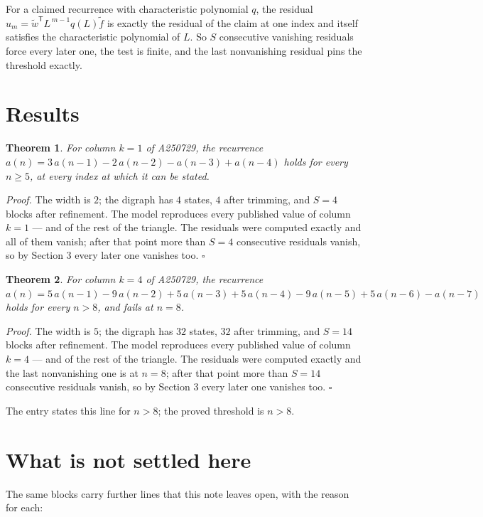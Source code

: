 \documentclass[11pt]{article}
\newtheorem{theorem}{Theorem}
\theoremstyle{definition}
\begin{document}
For a claimed recurrence with characteristic polynomial $q$, the residual $u_m = \tilde w^{\mathsf T}L^{\,m-1}q(L)\tilde f$ is exactly the residual of the claim at one index and itself satisfies the characteristic polynomial of $L$. So $S$ consecutive vanishing residuals force every later one, the test is finite, and the last nonvanishing residual pins the threshold exactly.

\section{Results}

\begin{theorem} For column $k = 1$ of A250729, the recurrence $a(n) = 3\,a(n-1) - 2\,a(n-2) - a(n-3) + a(n-4)$ holds for every $n \ge 5$, at every index at which it can be stated.\end{theorem}

{\itshape Proof.} The width is $2$; the digraph has $4$ states, $4$ after trimming, and $S = 4$ blocks after refinement. The model reproduces every published value of column $k = 1$ --- and of the rest of the triangle. The residuals were computed exactly and all of them vanish; after that point more than $S = 4$ consecutive residuals vanish, so by Section 3 every later one vanishes too. $\square$

\begin{theorem} For column $k = 4$ of A250729, the recurrence $a(n) = 5\,a(n-1) - 9\,a(n-2) + 5\,a(n-3) + 5\,a(n-4) - 9\,a(n-5) + 5\,a(n-6) - a(n-7)$ holds for every $n > 8$, and fails at $n = 8$.\end{theorem}

{\itshape Proof.} The width is $5$; the digraph has $32$ states, $32$ after trimming, and $S = 14$ blocks after refinement. The model reproduces every published value of column $k = 4$ --- and of the rest of the triangle. The residuals were computed exactly and the last nonvanishing one is at $n = 8$; after that point more than $S = 14$ consecutive residuals vanish, so by Section 3 every later one vanishes too. $\square$

The entry states this line for $n > 8$; the proved threshold is $n > 8$.

\section{What is not settled here}

The same blocks carry further lines that this note leaves open, with the reason for each:
\end{document}
